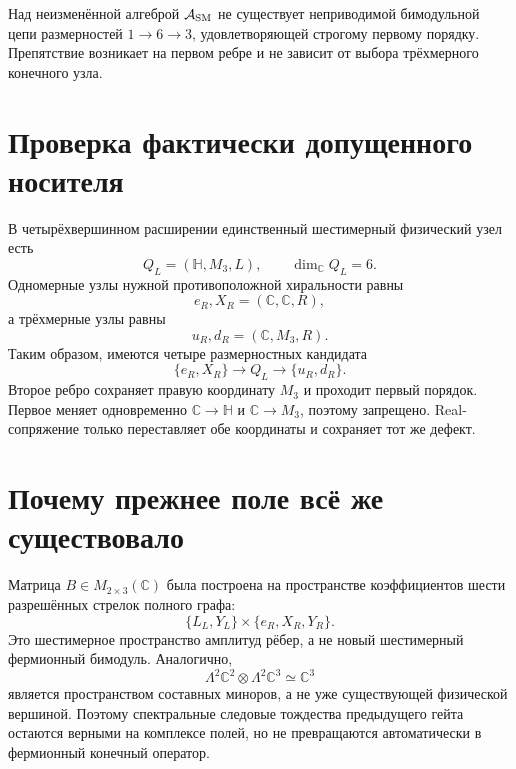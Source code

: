 \begin{theorem}
Над неизменённой алгеброй $\mathcal A_{\rm SM}$ не существует
неприводимой бимодульной цепи размерностей $1\to6\to3$, удовлетворяющей
строгому первому порядку. Препятствие возникает на первом ребре и не
зависит от выбора трёхмерного конечного узла.
\end{theorem}

\section{Проверка фактически допущенного носителя}

В четырёхвершинном расширении единственный шестимерный физический узел есть
\begin{equation}
 Q_L=(\mathbb H,M_3,L),\qquad \dim_{\mathbb C}Q_L=6.
 \label{eq:v7-coherence-bimodule-q-node}
\end{equation}
Одномерные узлы нужной противоположной хиральности равны
\begin{equation}
 e_R,X_R=(\mathbb C,\mathbb C,R),
 \label{eq:v7-coherence-bimodule-one-nodes}
\end{equation}
а трёхмерные узлы равны
\begin{equation}
 u_R,d_R=(\mathbb C,M_3,R).
 \label{eq:v7-coherence-bimodule-three-nodes}
\end{equation}
Таким образом, имеются четыре размерностных кандидата
\begin{equation}
 \{e_R,X_R\}\longrightarrow Q_L
 \longrightarrow\{u_R,d_R\}.
 \label{eq:v7-coherence-bimodule-four-candidates}
\end{equation}
Второе ребро сохраняет правую координату $M_3$ и проходит первый порядок.
Первое меняет одновременно $\mathbb C\to\mathbb H$ и
$\mathbb C\to M_3$, поэтому запрещено. Real-сопряжение только переставляет
обе координаты и сохраняет тот же дефект.

\section{Почему прежнее поле всё же существовало}

Матрица $B\in M_{2\times3}(\mathbb C)$ была построена на пространстве
коэффициентов шести разрешённых стрелок полного графа:
\begin{equation}
 \{L_L,Y_L\}\times\{e_R,X_R,Y_R\}.
 \label{eq:v7-coherence-bimodule-edge-space}
\end{equation}
Это шестимерное пространство амплитуд рёбер, а не новый шестимерный
фермионный бимодуль. Аналогично,
\begin{equation}
 \Lambda^2\mathbb C^2\otimes\Lambda^2\mathbb C^3
 \simeq\mathbb C^3
 \label{eq:v7-coherence-bimodule-exterior-endpoint}
\end{equation}
является пространством составных миноров, а не уже существующей физической
вершиной. Поэтому спектральные следовые тождества предыдущего гейта
остаются верными на комплексе полей, но не превращаются автоматически в
фермионный конечный оператор.

